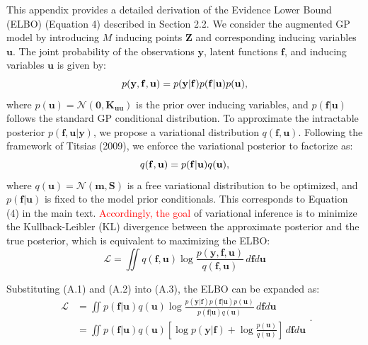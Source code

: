 \documentclass[11pt]{article}
\begin{document}
	This appendix provides a detailed derivation of the Evidence Lower Bound (ELBO) (Equation 4) described in Section 2.2. We consider the augmented GP model by introducing $M$ inducing points $\mathbf{Z}$ and corresponding inducing variables $\mathbf{u}$. The joint probability of the observations $\mathbf{y}$, latent functions $\mathbf{f}$, and inducing variables $\mathbf{u}$ is given by:
	\begin{equation}
		p({\bf{y}},{\bf{f}},{\bf{u}}) = p({\bf{y}}|{\bf{f}})p({\bf{f}}|{\bf{u}})p({\bf{u}}),
	\end{equation}
	where $p(\mathbf{u}) = \mathcal{N}(\mathbf{0}, \mathbf{K}_{\mathbf{uu}})$ is the prior over inducing variables, and $p(\mathbf{f} | \mathbf{u})$ follows the standard GP conditional distribution. To approximate the intractable posterior $p(\mathbf{f}, \mathbf{u} | \mathbf{y})$, we propose a variational distribution $q(\mathbf{f}, \mathbf{u})$. Following the framework of Titsias (2009), we enforce the variational posterior to factorize as:
	\begin{equation}
		q({\bf{f}},{\bf{u}}) = p({\bf{f}}|{\bf{u}})q({\bf{u}}),
	\end{equation}
	where $q(\mathbf{u}) = \mathcal{N}(\mathbf{m}, \mathbf{S})$ is a free variational distribution to be optimized, and $p(\mathbf{f} | \mathbf{u})$ is fixed to the model prior conditionals. This corresponds to Equation (4) in the main text. \textcolor{red}{Accordingly, the goal} of variational inference is to minimize the Kullback-Leibler (KL) divergence between the approximate posterior and the true posterior, which is equivalent to maximizing the ELBO:%
	\begin{equation}
		\mathcal{L} = \iint q(\mathbf{f}, \mathbf{u}) \log \frac{p(\mathbf{y}, \mathbf{f}, \mathbf{u})}{q(\mathbf{f}, \mathbf{u})} \, d\mathbf{f} d\mathbf{u}
	\end{equation}

	Substituting (A.1) and (A.2) into (A.3), the ELBO can be expanded as:
	\begin{equation}
		\begin{aligned}
			\mathcal{L} &= \iint p(\mathbf{f}|\mathbf{u})q(\mathbf{u}) \log \frac{p(\mathbf{y}|\mathbf{f})p(\mathbf{f}|\mathbf{u})p(\mathbf{u})}{p(\mathbf{f}|\mathbf{u})q(\mathbf{u})} \, d\mathbf{f}d\mathbf{u} \\
			&= \iint p(\mathbf{f}|\mathbf{u})q(\mathbf{u}) \left[ \log p(\mathbf{y}|\mathbf{f}) + \log \frac{p(\mathbf{u})}{q(\mathbf{u})} \right] \, d\mathbf{f}d\mathbf{u}
		\end{aligned}.
	\end{equation}
\end{document}
